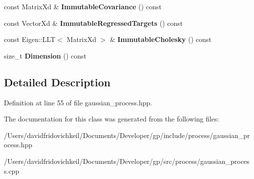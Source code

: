 \begin{DoxyCompactItemize}
const Matrix\+Xd \& {\bfseries Immutable\+Covariance} () const
\item 
\hypertarget{classgp_1_1_gaussian_process_ac80689ba379920754defa7e585cf20bf}{}\label{classgp_1_1_gaussian_process_ac80689ba379920754defa7e585cf20bf} 
const Vector\+Xd \& {\bfseries Immutable\+Regressed\+Targets} () const
\item 
\hypertarget{classgp_1_1_gaussian_process_a281b5c08bb7a012203a49d992098e0c3}{}\label{classgp_1_1_gaussian_process_a281b5c08bb7a012203a49d992098e0c3} 
const Eigen\+::\+L\+LT$<$ Matrix\+Xd $>$ \& {\bfseries Immutable\+Cholesky} () const
\item 
\hypertarget{classgp_1_1_gaussian_process_ac1c7728df9a864da192ad77656f5567e}{}\label{classgp_1_1_gaussian_process_ac1c7728df9a864da192ad77656f5567e} 
size\+\_\+t {\bfseries Dimension} () const
\end{DoxyCompactItemize}


\subsection{Detailed Description}


Definition at line 55 of file gaussian\+\_\+process.\+hpp.



The documentation for this class was generated from the following files\+:\begin{DoxyCompactItemize}
\item 
/\+Users/davidfridovichkeil/\+Documents/\+Developer/gp/include/process/gaussian\+\_\+process.\+hpp\item 
/\+Users/davidfridovichkeil/\+Documents/\+Developer/gp/src/process/gaussian\+\_\+process.\+cpp\end{DoxyCompactItemize}

